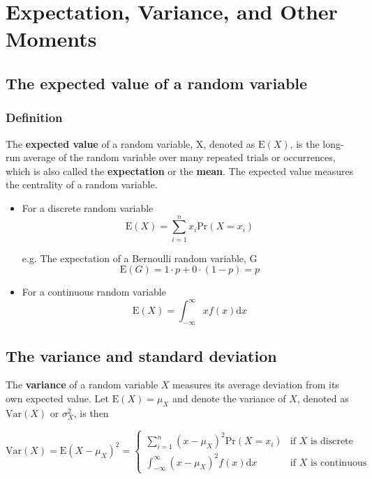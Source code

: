 \documentclass[a4paper,11pt]{article}
\begin{document}
\section{Expectation, Variance, and Other Moments}
\label{sec:org00d81e1}

\subsection{The expected value of a random variable}
\label{sec:org8754dc8}

\subsubsection*{Definition}
\label{sec:org96e70e0}

The \textbf{expected value} of a random variable, X, denoted as \(\mathrm{E}(X)\), is
the long-run average of the random variable over many repeated
trials or occurrences, which is also called the \textbf{expectation} or the
\textbf{mean}. The expected value measures the centrality of a random
variable.

\begin{itemize}
\item For a discrete random variable
\[ \mathrm{E}(X) = \sum_{i=1}^n x_i \mathrm{Pr}(X = x_i) \]

e.g. The expectation of a Bernoulli random variable, G
  \[ \mathrm{E}(G) = 1 \cdot p + 0 \cdot (1-p) = p \]

\item For a continuous random variable
\[ \mathrm{E}(X) = \int_{-\infty}^{\infty} x f(x) \mathrm{d}x\]
\end{itemize}

\subsection{The variance and standard deviation}
\label{sec:org93e4954}

The \textbf{variance} of a random variable \(X\) measures its average
deviation from its own expected value. Let \(\mathrm{E}(X) = \mu_X\) and denote
the variance of \(X\), denoted as \(\mathrm{Var}(X)\) or \(\sigma^2_X\), is then

\begin{equation*}
\mathrm{Var}(X) = \mathrm{E}(X-\mu_X)^{2}=
\begin{cases}
\sum_{i=1}^n (x - \mu_X)^{2}\mathrm{Pr}(X = x_i) & \text{if } X \text{ is discrete} \\
\int_{-\infty}^{\infty} (x - \mu_X)^{2}f(x)\mathrm{d} x  & \text{if } X \text{ is continuous}
\end{cases}
\end{equation*}
\end{document}

